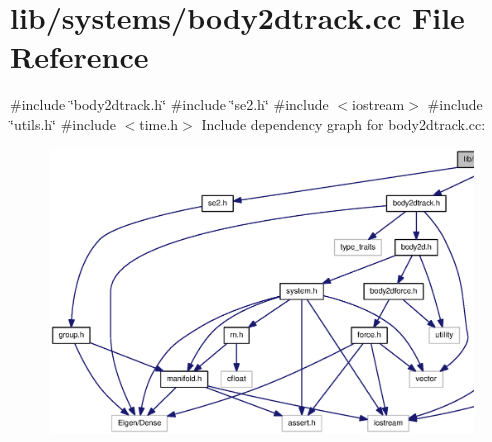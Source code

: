 \section{lib/systems/body2dtrack.cc \-File \-Reference}
\label{body2dtrack_8cc}
{\ttfamily \#include \char`\"{}body2dtrack.\-h\char`\"{}}\*
{\ttfamily \#include \char`\"{}se2.\-h\char`\"{}}\*
{\ttfamily \#include $<$iostream$>$}\*
{\ttfamily \#include \char`\"{}utils.\-h\char`\"{}}\*
{\ttfamily \#include $<$time.\-h$>$}\*
\-Include dependency graph for body2dtrack.\-cc\-:\nopagebreak
\begin{figure}[H]
\begin{center}
\leavevmode
\includegraphics[width=350pt]{body2dtrack_8cc__incl}
\end{center}
\end{figure}
